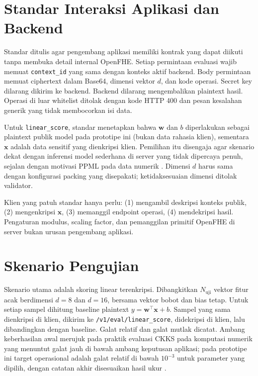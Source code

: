\documentclass[12pt,a4paper,oneside]{report}
\begin{document}
\section{Standar Interaksi Aplikasi dan Backend}

Standar ditulis agar pengembang aplikasi memiliki kontrak yang dapat diikuti tanpa membuka detail internal OpenFHE. Setiap permintaan evaluasi wajib memuat \texttt{context\_id} yang sama dengan konteks aktif backend. Body permintaan memuat ciphertext dalam Base64, dimensi vektor $d$, dan kode operasi. Secret key dilarang dikirim ke backend. Backend dilarang mengembalikan plaintext hasil. Operasi di luar whitelist ditolak dengan kode HTTP 400 dan pesan kesalahan generik yang tidak membocorkan isi data.

Untuk \texttt{linear\_score}, standar menetapkan bahwa $\mathbf{w}$ dan $b$ diperlakukan sebagai plaintext publik model pada prototipe ini (bukan data rahasia klien), sementara $\mathbf{x}$ adalah data sensitif yang dienkripsi klien. Pemilihan itu disengaja agar skenario dekat dengan inferensi model sederhana di server yang tidak dipercaya penuh, sejalan dengan motivasi PPML pada data numerik \cite{wu2025ckksSurvey}. Dimensi $d$ harus sama dengan konfigurasi packing yang disepakati; ketidaksesuaian dimensi ditolak validator.

Klien yang patuh standar hanya perlu: (1) mengambil deskripsi konteks publik, (2) mengenkripsi $\mathbf{x}$, (3) memanggil endpoint operasi, (4) mendekripsi hasil. Pengaturan modulus, scaling factor, dan pemanggilan primitif OpenFHE di server bukan urusan pengembang aplikasi.

\section{Skenario Pengujian}

Skenario utama adalah skoring linear terenkripsi. Dibangkitkan $N_{\text{uji}}$ vektor fitur acak berdimensi $d=8$ dan $d=16$, bersama vektor bobot dan bias tetap. Untuk setiap sampel dihitung baseline plaintext $y=\mathbf{w}^{\top}\mathbf{x}+b$. Sampel yang sama dienkripsi di klien, dikirim ke \texttt{/v1/eval/linear\_score}, didekripsi di klien, lalu dibandingkan dengan baseline. Galat relatif dan galat mutlak dicatat. Ambang keberhasilan awal merujuk pada praktik evaluasi CKKS pada komputasi numerik yang menuntut galat jauh di bawah ambang keputusan aplikasi; pada prototipe ini target operasional adalah galat relatif di bawah $10^{-3}$ untuk parameter yang dipilih, dengan catatan akhir disesuaikan hasil ukur \cite{vinko2026secureByDesign}.
\end{document}
